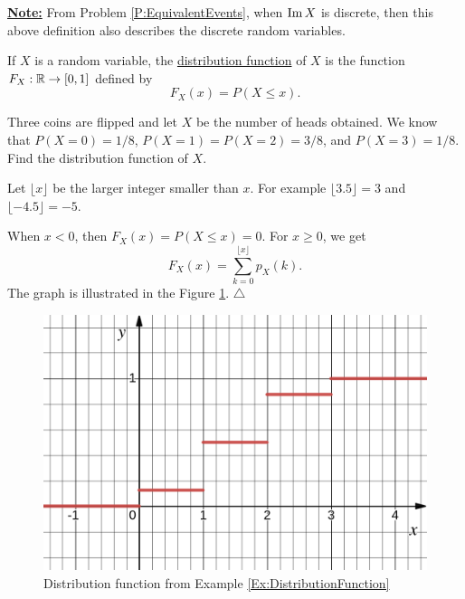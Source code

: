 \underline{\textbf{Note:}} From Problem \ref{P:EquivalentEvents}, when $\operatorname{Im} X$ is discrete, then this above definition also describes the discrete random variables.

\begin{definition}
If $X$ is a random variable, the \underline{distribution function} of $X$ is the function $F_X : \mathbb{R} \rightarrow [0,1]$ defined by
\[
    F_X (x) = P (X \leq x ) .
\]
\end{definition}

\begin{example}\label{Ex:DistributionFunction}
Three coins are flipped and let $X$ be the number of heads obtained. We know that $P (X = 0) = 1/8$, $P (X = 1) = P (X = 2) = 3/8$, and $P (X = 3) = 1/8$. Find the distribution function of $X$.
\end{example}

\begin{sol*}
Let $\lfloor x \rfloor$ be the larger integer smaller than $x$. For example $\lfloor 3.5 \rfloor = 3$ and $\lfloor -4.5 \rfloor = -5$.

When $x < 0$, then $F_X (x) = P (X \leq x ) = 0$. For $x \geq 0$, we get
    \[
        F_X (x) = \sum_{k = 0}^{\lfloor x \rfloor} p_X (k) .
    \]
The graph is illustrated in the Figure \ref{fig:DistributionFromFirstExample}. \hfill $\triangle$
\end{sol*}
\begin{figure}[ht]
\centering
\includegraphics[scale=0.3]{distributionFunction-Example.png}
\caption{Distribution function from Example \ref{Ex:DistributionFunction}}\label{fig:DistributionFromFirstExample}
\end{figure}

